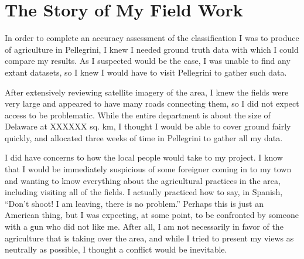 \chapter{The Story of My Field Work}

In order to complete an accuracy assessment of the classification I was to produce of agriculture in Pellegrini, I knew I needed ground truth data with which I could compare my results. As I suspected would be the case, I was unable to find any extant datasets, so I knew I would have to visit Pellegrini to gather such data.

After extensively reviewing satellite imagery of the area, I knew the fields were very large and appeared to have many roads connecting them, so I did not expect access to be problematic. While the entire department is about the size of Delaware at XXXXXX sq. km, I thought I would be able to cover ground fairly quickly, and allocated three weeks of time in Pellegrini to gather all my data.

I did have concerns to how the local people would take to my project. I know that I would be immediately suspicious of some foreigner coming in to my town and wanting to know everything about the agricultural practices in the area, including visiting all of the fields. I actually practiced how to say, in Spanish, “Don’t shoot! I am leaving, there is no problem.” Perhaps this is just an American thing, but I was expecting, at some point, to be confronted by someone with a gun who did not like me. After all, I am not necessarily in favor of the agriculture that is taking over the area, and while I tried to present my views as neutrally as possible, I thought a conflict would be inevitable.

